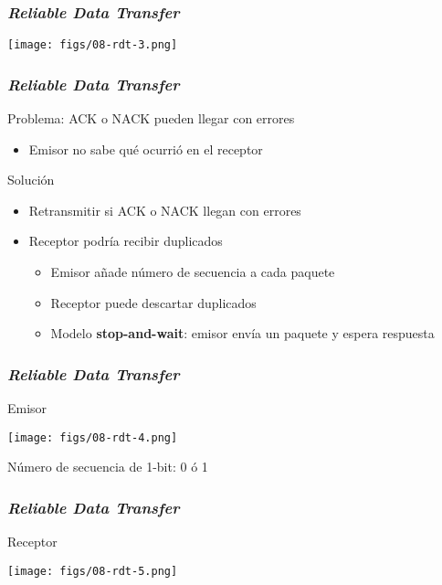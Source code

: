 \documentclass[letter]{beamer}
\begin{document}
\begin{frame}
  \frametitle{{\em Reliable Data Transfer}}

  \begin{center}
    \texttt{[image: figs/08-rdt-3.png]}
  \end{center}

\end{frame}

\begin{frame}
  \frametitle{{\em Reliable Data Transfer}}

  Problema: ACK o NACK pueden llegar con errores
  \begin{itemize}
    \item Emisor no sabe qué ocurrió en el receptor
  \end{itemize}
  Solución
  \begin{itemize}
    \item Retransmitir si ACK o NACK llegan con errores
    \item Receptor podría recibir duplicados
      \begin{itemize}
        \item Emisor añade número de secuencia a cada paquete
        \item Receptor puede descartar duplicados
        \item Modelo {\bf stop-and-wait}: emisor envía un paquete y espera respuesta
      \end{itemize}
  \end{itemize}

\end{frame}
\begin{frame}
  \frametitle{{\em Reliable Data Transfer}}

  Emisor
  \begin{center}
    \texttt{[image: figs/08-rdt-4.png]}
  \end{center}
  Número de secuencia de 1-bit: 0 ó 1
\end{frame}
\begin{frame}
  \frametitle{{\em Reliable Data Transfer}}

  Receptor
  \begin{center}
    \texttt{[image: figs/08-rdt-5.png]}
  \end{center}

\end{frame}
\end{document}
